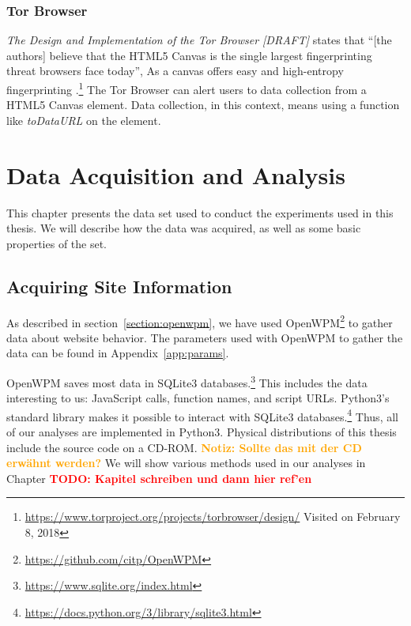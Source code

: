 \documentclass[
    fontsize=12pt,
    headings=small,
    parskip=half,
    bibliography=totoc,
    numbers=noenddot,
    open=any
    ]{scrreprt}
\newcommand{\dominik}[1]{\textcolor{orange}{\textbf{Notiz: #1}}}
\newcommand{\todo}[1]{\textcolor{red}{\textbf{TODO: #1}}}
\begin{document}
\subsection{Tor Browser}
\label{related_work:tor_browser}
\textit{The Design and Implementation of the Tor Browser [DRAFT]}
states that ``[the authors] believe that the HTML5 Canvas is the single largest fingerprinting threat browsers face today'',
As a canvas offers easy and high-entropy fingerprinting
\cite{acar2014web,mowery2012pixel}.\footnote{\url{https://www.torproject.org/projects/torbrowser/design/} Visited on February 8, 2018}
The Tor Browser can alert users to data collection from a HTML5 Canvas element.
Data collection, in this context, means using a function like \textit{toDataURL} on the element.



\chapter{Data Acquisition and Analysis}
\label{chap:data_acquisition}
This chapter presents the data set used to conduct the experiments used in this thesis.
We will describe how the data was acquired, as well as some basic properties of the set.

\section{Acquiring Site Information}
As described in section~\ref{section:openwpm}, we have used OpenWPM\footnote{\url{https://github.com/citp/OpenWPM}} to gather data about
website behavior.
The parameters used with OpenWPM to gather the data can be found in Appendix~\ref{app:params}.

OpenWPM saves most data in SQLite3 databases.\footnote{\url{https://www.sqlite.org/index.html}}
This includes the data interesting to us: JavaScript calls, function names, and script URLs.
Python3's standard library makes it possible to interact with SQLite3
databases.\footnote{\url{https://docs.python.org/3/library/sqlite3.html}}
Thus, all of our analyses are implemented in Python3.
Physical distributions of this thesis include the source code on a CD-ROM.
\dominik{Sollte das mit der CD erwähnt werden?}
We will show various methods used in our analyses in Chapter \todo{Kapitel schreiben und dann hier ref'en}
\end{document}
